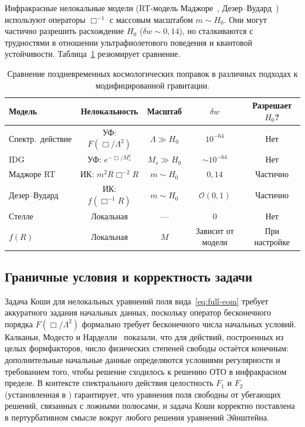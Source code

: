 \documentclass[12pt,a4paper]{article}
\newcommand{\order}{\mathcal{O}}
\newcommand{\Lam}{\Lambda}
\theoremstyle{plain}
\theoremstyle{definition}
\begin{document}
Инфракрасные нелокальные модели (RT-модель
Маджоре~\cite{Maggiore:2016gpx},
Дезер--Вудард~\cite{Deser:2007jk}) используют операторы $\Box^{-1}$
с массовым масштабом $m \sim H_0$.  Они могут частично разрешить
расхождение $H_0$ ($\delta w \sim 0{,}14$), но сталкиваются с трудностями
в отношении ультрафиолетового поведения и квантовой устойчивости.
Таблица~\ref{tab:comparison} резюмирует сравнение.

\begin{table}[H]
\centering
\caption{Сравнение поздневременных космологических поправок в различных
подходах к модифицированной гравитации.}
\label{tab:comparison}
\begin{tabular}{lcccc}
\toprule
Модель & Нелокальность & Масштаб & $\delta w$ & Разрешает $H_0$? \\
\midrule
Спектр.\ действие & УФ: $F(\Box/\Lam^2)$ & $\Lam \gg H_0$ & $10^{-64}$ & Нет \\
IDG & УФ: $e^{-\Box/M_s^2}$ & $M_s \gg H_0$ & $\sim 10^{-64}$ & Нет \\
Маджоре RT & ИК: $m^2 R\Box^{-2}R$ & $m \sim H_0$ & $0{,}14$ & Частично \\
Дезер--Вудард & ИК: $f(\Box^{-1}R)$ & $m \sim H_0$
  & $\order(0{,}1)$ & Частично \\
Стелле & Локальная & --- & $0$ & Нет \\
$f(R)$ & Локальная & $M$ & Зависит от модели & При настройке \\
\bottomrule
\end{tabular}
\end{table}

\subsection{Граничные условия и корректность задачи}

Задача Коши для нелокальных уравнений поля вида~\eqref{eq:full-eom}
требует аккуратного задания начальных данных, поскольку оператор
бесконечного порядка $F(\Box/\Lam^2)$ формально требует бесконечного
числа начальных условий.  Калканьи, Модесто и
Нарделли~\cite{Calcagni:2018gke} показали, что для действий, построенных
из целых формфакторов, число физических степеней свободы остаётся
конечным: дополнительные начальные данные определяются условиями
регулярности и требованием того, чтобы решение сходилось к решению ОТО
в инфракрасном пределе.  В контексте спектрального действия целостность $F_1$ и $F_2$
(установленная в \cite{Alfyorov:2026ff}) гарантирует, что уравнения поля свободны от
убегающих решений, связанных с ложными полюсами, и задача Коши корректно
поставлена в пертурбативном смысле вокруг любого решения уравнений
Эйнштейна.
\end{document}
